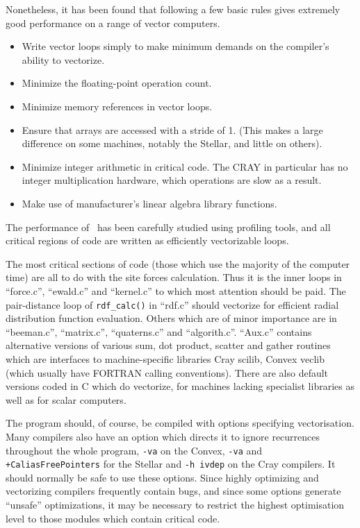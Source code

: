 Nonetheless, it has been found that following a few basic rules gives
extremely good performance on a range of vector computers.
\begin{itemize}
\item Write vector loops simply to make minimum demands on the
compiler's ability to vectorize.
\item Minimize the floating-point operation count.
\item Minimize memory references in vector loops.
\item Ensure that arrays are accessed with a stride of 1.  (This makes
a large difference on some machines, notably the Stellar, and little
on others). 
\item Minimize integer arithmetic in critical code.  The CRAY in
particular has no  integer multiplication hardware, which operations
are slow as a result.
\item Make use of manufacturer's linear algebra library functions.
\end{itemize}
The performance of \moldy\  has been carefully studied using profiling
tools, and all critical regions of code are written as efficiently
vectorizable loops.  

The most critical sections of code (\ie those which use the majority
of the computer time) are all to do with the site forces calculation.
Thus it is the inner loops in ``force.c'', ``ewald.c'' and
``kernel.c'' to which most attention should be paid.  The
pair-distance loop of \verb'rdf_calc()' in ``rdf.c'' should vectorize
for efficient radial distribution function evaluation. Others which
are of minor importance are in ``beeman.c'', ``matrix.c'',
``quaterns.c'' and ``algorith.c''.  ``Aux.c'' contains alternative
versions of various sum, dot product, scatter and gather routines
\etc which are interfaces to machine-specific libraries \eg
Cray scilib, Convex veclib (which usually have FORTRAN calling
conventions). There are also default versions coded in C which do
vectorize, for machines lacking specialist libraries as well as for
scalar computers.

The program should, of course, be compiled with options specifying
vectorisation. Many compilers also have an option which directs it to
ignore recurrences throughout the whole program, \eg \verb'-va' on the
Convex, \verb'-va' and \verb'+CaliasFreePointers' for the Stellar and
\verb'-h ivdep' on the Cray compilers. It should  normally be safe to
use these options.  Since highly optimizing and vectorizing compilers
frequently contain bugs, and since some options generate ``unsafe''
optimizations,  it may be necessary to restrict the highest
optimisation level to those modules which contain critical code.

